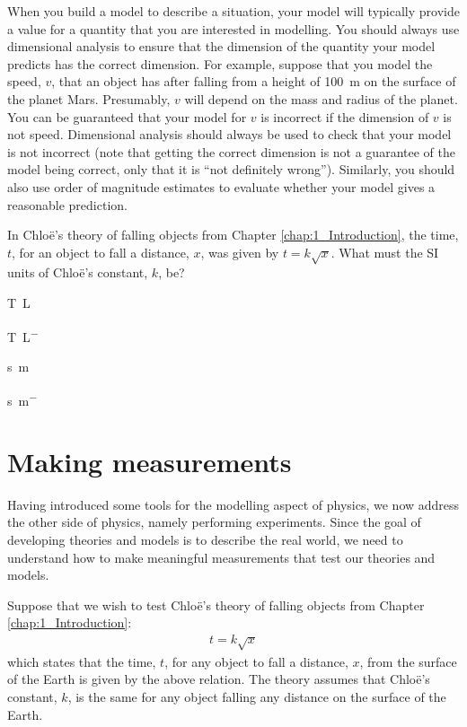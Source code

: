 When you build a model to describe a situation, your model will typically provide a value for a quantity that you are interested in modelling. You should always use dimensional analysis to ensure that the dimension of the quantity your model predicts has the correct dimension. For example, suppose that you model the speed, $v$, that an object has after falling from a height of \SI{100}{\meter} on the surface of the planet Mars. Presumably, $v$ will depend on the mass and radius of the planet. You can be guaranteed that your model for $v$ is incorrect if the dimension of $v$ is not speed. Dimensional analysis should always be used to check that your model is not incorrect (note that getting the correct dimension is not a guarantee of the model being correct, only that it is ``not definitely wrong''). Similarly, you should also use order of magnitude estimates to evaluate whether your model gives a reasonable prediction.

\begin{checkpointMC}{In Chlo\"e's theory of falling objects from Chapter \ref{chap:1_Introduction}, the time, $t$, for an object to fall a distance, $x$, was given by $t=k\sqrt{x}$. What must the SI units of Chlo\"e's constant, $k$, be?}
\item \si{T.L^{}}
\item \si{T.L^{-}}
\item \si{s.m^{}}
\item \si{s.m^{-}} %
\end{checkpointMC}

\section{Making measurements}
Having introduced some tools for the modelling aspect of physics, we now address the other side of physics, namely performing experiments. Since the goal of developing theories and models is to describe the real world, we need to understand how to make meaningful measurements that test our theories and models.

Suppose that we wish to test Chlo\"e's theory of falling objects from Chapter \ref{chap:1_Introduction}:
\begin{align*}
t=k\sqrt{x}
\end{align*}
which states that the time, $t$, for any object to fall a distance, $x$, from the surface of the Earth is given by the above relation. The theory assumes that Chlo\"e's constant, $k$, is the same for any object falling any distance on the surface of the Earth.

